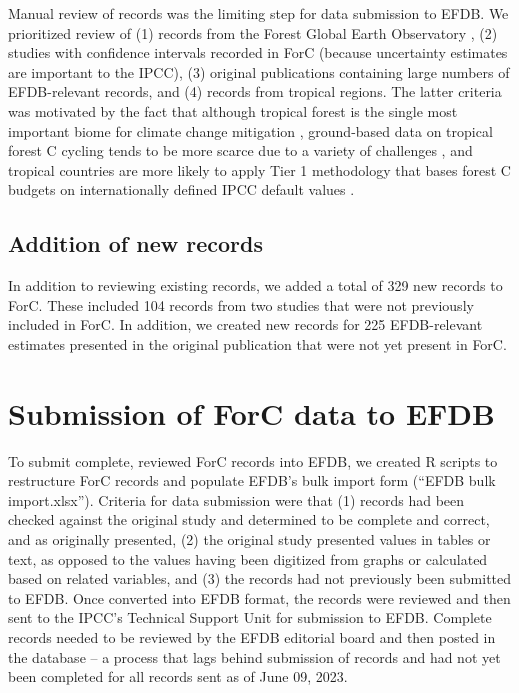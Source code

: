 \documentclass[, manuscript]{copernicus}
\begin{document}
Manual review of records was the limiting step for data submission to
EFDB. We prioritized review of (1) records from the Forest Global Earth
Observatory
\citep[ForestGEO,][]{anderson-teixeira_ctfsforestgeo_2015, davies_forestgeo_2021},
(2) studies with confidence intervals recorded in ForC (because
uncertainty estimates are important to the IPCC), (3) original
publications containing large numbers of EFDB-relevant records, and (4)
records from tropical regions. The latter criteria was motivated by the
fact that although tropical forest is the single most important biome
for climate change mitigation \citep{refs}, ground-based data on
tropical forest C cycling tends to be more scarce due to a variety of
challenges \citep{refs, delima_making_2022}, and tropical countries are
more likely to apply Tier 1 methodology that bases forest C budgets on
internationally defined IPCC default values
\citep{romijn_assessing_2015}.

\subsection{Addition of new records}

In addition to reviewing existing records, we added a total of 329 new
records to ForC. These included 104 records from two studies
\citep{piponiot_distribution_2022, lutz_largediameter_2021} that were
not previously included in ForC. In addition, we created new records for
225 EFDB-relevant estimates presented in the original publication that
were not yet present in ForC.

\section{Submission of ForC data to EFDB}

To submit complete, reviewed ForC records into EFDB, we created R
scripts to restructure ForC records and populate EFDB's bulk import form
(``EFDB bulk import.xlsx''). Criteria for data submission were that (1)
records had been checked against the original study and determined to be
complete and correct, and as originally presented, (2) the original
study presented values in tables or text, as opposed to the values
having been digitized from graphs or calculated based on related
variables, and (3) the records had not previously been submitted to
EFDB. Once converted into EFDB format, the records were reviewed and
then sent to the IPCC's Technical Support Unit for submission to EFDB.
Complete records needed to be reviewed by the EFDB editorial board and
then posted in the database -- a process that lags behind submission of
records and had not yet been completed for all records sent as of June
09, 2023.
\end{document}
